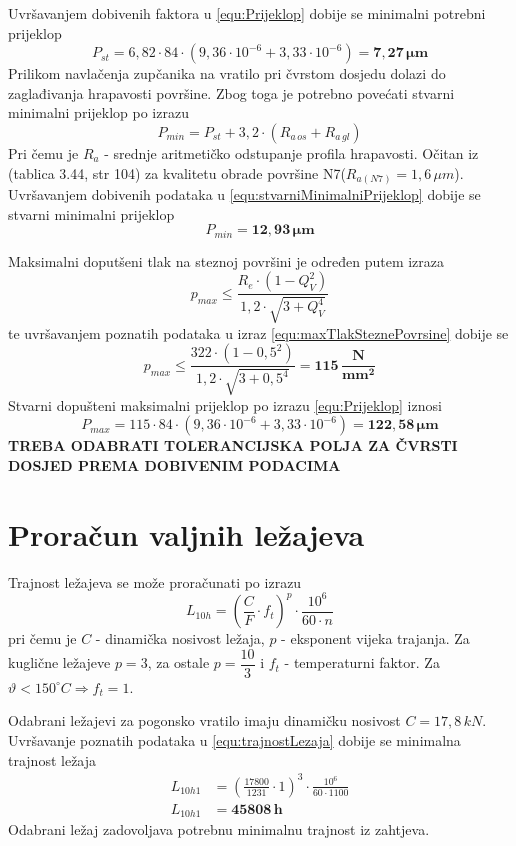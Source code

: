 \documentclass[11pt,a4paper]{report}
\begin{document}
Uvršavanjem dobivenih faktora u \eqref{equ:Prijeklop} dobije se minimalni potrebni prijeklop
$$
P_{st}=6,82 \cdot 84 \cdot (9,36 \cdot 10^{-6} + 3,33 \cdot 10^{-6})= \mathbf{7,27 \, \mu m}
$$
Prilikom navlačenja zupčanika na vratilo pri čvrstom dosjedu dolazi do zaglađivanja hrapavosti površine. Zbog toga je potrebno povećati stvarni minimalni prijeklop po izrazu
\begin{equation}
P_{min}=P_{st}+3,2 \cdot (R_{a \, os}+R_{a \, gl})\label{equ:stvarniMinimalniPrijeklop}
\end{equation}
Pri čemu je $R_a$ - srednje aritmetičko odstupanje profila hrapavosti. Očitan iz \cite{krivzan1998osnove}(tablica 3.44, str 104) za kvalitetu obrade površine N7($R_{a(N7)}=1,6 \, \mu m$).
Uvršavanjem dobivenih podataka u \eqref{equ:stvarniMinimalniPrijeklop} dobije se stvarni minimalni prijeklop
$$
P_{min}=\mathbf{12,93 \, \mu m}
$$

Maksimalni doputšeni tlak na steznoj površini je određen putem izraza
\begin{equation}
p_{max}\leq\frac{R_e \cdot (1-Q_V^2)}{1,2\cdot \sqrt{3+Q_V^4}}\label{equ:maxTlakSteznePovrsine}
\end{equation}
te uvršavanjem poznatih podataka u izraz \eqref{equ:maxTlakSteznePovrsine} dobije se
$$
p_{max}\leq\frac{322 \cdot (1-0,5^2)}{1,2\cdot \sqrt{3+0,5^4}}=\mathbf{115 \, \dfrac{N}{mm^2}}
$$
Stvarni dopušteni maksimalni prijeklop po izrazu \eqref{equ:Prijeklop} iznosi
$$
P_{max}=115 \cdot 84 \cdot (9,36 \cdot 10^{-6} + 3,33 \cdot 10^{-6})= \mathbf{122,58 \, \mu m}
$$
\textbf{TREBA ODABRATI TOLERANCIJSKA POLJA ZA ČVRSTI DOSJED PREMA DOBIVENIM PODACIMA}

\section{Proračun valjnih ležajeva}
Trajnost ležajeva se može proračunati po izrazu
\begin{equation}
L_{10h}=\left(\frac{C}{F} \cdot f_t \right)^p \cdot \frac{10^6}{60 \cdot n}
\label{equ:trajnostLezaja}
\end{equation}
pri čemu je $C$ - dinamička nosivost ležaja, $p$ - eksponent vijeka trajanja. Za kuglične ležajeve $p=3$, za ostale $p=\dfrac{10}{3}$ i $f_t$ - temperaturni faktor. Za $\vartheta < 150^\circ C \Rightarrow f_t=1$.

Odabrani ležajevi za pogonsko vratilo imaju dinamičku nosivost $C=17,8 \,kN$.
Uvršavanje poznatih podataka u \eqref{equ:trajnostLezaja} dobije se minimalna trajnost ležaja
\begin{align*}
L_{10h1}&=\left(\frac{17800}{1231} \cdot 1 \right)^3 \cdot \frac{10^6}{60 \cdot 1100}\\
L_{10h1}&=\mathbf{45808\, h}
\end{align*}
Odabrani ležaj zadovoljava potrebnu minimalnu trajnost iz zahtjeva.
\end{document}
